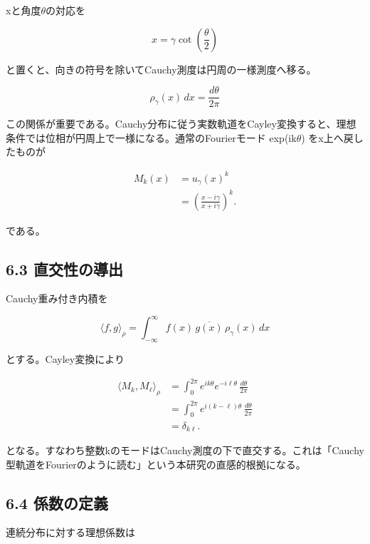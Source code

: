 \documentclass[11pt,a4paper]{ltjsarticle}
\begin{document}
xと角度\(\theta\)の対応を\par

\[
x=\gamma\cot\!\left(\frac{\theta}{2}\right)
\]

と置くと、向きの符号を除いてCauchy測度は円周の一様測度へ移る。\par

\[
\rho_{\gamma}(x)\,dx=\frac{d\theta}{2\pi}
\]

この関係が重要である。Cauchy分布に従う実数軌道をCayley変換すると、理想条件では位相が円周上で一様になる。通常のFourierモード exp(ik\(\theta\)) をx上へ戻したものが\par

\[
\begin{aligned}
M_k(x)&=u_{\gamma}(x)^k\\
&=\left(\frac{x-i\gamma}{x+i\gamma}\right)^k.
\end{aligned}
\]

である。\par

\subsection*{\textcolor{researchblue}{6.3 直交性の導出}}

Cauchy重み付き内積を\par

\[
\langle f,g\rangle_{\rho}=\int_{-\infty}^{\infty}f(x)\,\overline{g(x)}\,\rho_{\gamma}(x)\,dx
\]

とする。Cayley変換により\par

\[
\begin{aligned}
\langle M_k,M_{\ell}\rangle_{\rho}
&=\int_{0}^{2\pi}e^{ik\theta}e^{-i\ell\theta}\,\frac{d\theta}{2\pi}\\
&=\int_{0}^{2\pi}e^{i(k-\ell)\theta}\,\frac{d\theta}{2\pi}\\
&=\delta_{k\ell}.
\end{aligned}
\]

となる。すなわち整数kのモードはCauchy測度の下で直交する。これは「Cauchy型軌道をFourierのように読む」という本研究の直感的根拠になる。\par

\subsection*{\textcolor{researchblue}{6.4 係数の定義}}

連続分布に対する理想係数は\par
\end{document}

